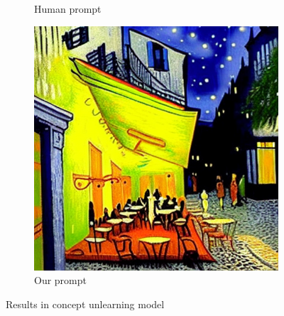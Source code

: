 \begin{figure}[ht]
\begin{subfigure}[t]{0.32\linewidth}
            \vspace{-0.2in}
            \caption{\small Human prompt}
            \label{app:unlearn_human}
        \end{subfigure}
        \hfill
        \begin{subfigure}[t]{0.32\linewidth}
            \centering
            \includegraphics[width=\linewidth]{figure_folder/vangogh_our.png}
            \vspace{-0.2in}
            \caption{\small Our prompt}
            \label{app:unlearn_ours}
        \end{subfigure}
        \vspace{-0.01in}
        \caption{\small Results in concept unlearning model}
        \label{app:unlearning_model}
\end{figure}
